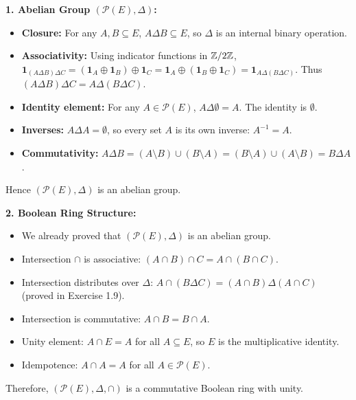 \begin{solution}
\textbf{1. Abelian Group $(\mathcal{P}(E), \Delta)$:}
\begin{itemize}[leftmargin=1.5em,itemsep=2pt]
  \item \textbf{Closure:} For any $A, B \subseteq E$, $A \Delta B \subseteq E$, so $\Delta$ is an internal binary operation.
  \item \textbf{Associativity:} Using indicator functions in $\mathbb{Z}/2\mathbb{Z}$, $\mathbf{1}_{(A \Delta B) \Delta C} = (\mathbf{1}_A \oplus \mathbf{1}_B) \oplus \mathbf{1}_C = \mathbf{1}_A \oplus (\mathbf{1}_B \oplus \mathbf{1}_C) = \mathbf{1}_{A \Delta (B \Delta C)}$. Thus $(A \Delta B) \Delta C = A \Delta (B \Delta C)$.
  \item \textbf{Identity element:} For any $A \in \mathcal{P}(E)$, $A \Delta \emptyset = A$. The identity is $\emptyset$.
  \item \textbf{Inverses:} $A \Delta A = \emptyset$, so every set $A$ is its own inverse: $A^{-1} = A$.
  \item \textbf{Commutativity:} $A \Delta B = (A \setminus B) \cup (B \setminus A) = (B \setminus A) \cup (A \setminus B) = B \Delta A$.
\end{itemize}
Hence $(\mathcal{P}(E), \Delta)$ is an abelian group.

\textbf{2. Boolean Ring Structure:}
\begin{itemize}[leftmargin=1.5em,itemsep=2pt]
  \item We already proved that $(\mathcal{P}(E), \Delta)$ is an abelian group.
  \item Intersection $\cap$ is associative: $(A \cap B) \cap C = A \cap (B \cap C)$.
  \item Intersection distributes over $\Delta$: $A \cap (B \Delta C) = (A \cap B) \Delta (A \cap C)$ (proved in Exercise 1.9).
  \item Intersection is commutative: $A \cap B = B \cap A$.
  \item Unity element: $A \cap E = A$ for all $A \subseteq E$, so $E$ is the multiplicative identity.
  \item Idempotence: $A \cap A = A$ for all $A \in \mathcal{P}(E)$.
\end{itemize}
Therefore, $(\mathcal{P}(E), \Delta, \cap)$ is a commutative Boolean ring with unity.


\end{solution}
